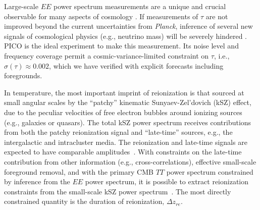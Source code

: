 \documentclass[PICOReport.tex]{subfiles}
\begin{document}
Large-scale $EE$ power spectrum measurements are a unique and crucial observable for many aspects of cosmology .  
If measurements of $\tau$ are not improved beyond the current uncertainties from {\em Planck}, inference of several new signals 
of cosmological physics (e.g., neutrino mass) will be severely hindered .  
PICO is the ideal experiment to make this measurement.  
Its noise level and frequency coverage permit a cosmic-variance-limited constraint on $\tau$, i.e., $\sigma(\tau) \approx 0.002$, which we have verified with explicit forecasts including foregrounds. 

In temperature, the most important imprint of reionization is that sourced at small angular scales by the ``patchy'' kinematic 
Sunyaev-Zel'dovich (kSZ) effect, due to the peculiar velocities of free electron bubbles around ionizing sources (e.g., galaxies or quasars).  
The total kSZ power spectrum receives contributions from both the patchy reionization signal and ``late-time'' sources, e.g., the intergalactic and 
intracluster media.  The reionization and late-time signals are expected to have comparable 
amplitudes~\citep{Shaw2012,MMS2012,Battaglia2013}.  With constraints on the late-time contribution from other 
information (e.g., cross-correlations), effective small-scale foreground removal, and with the primary CMB $TT$ power 
spectrum constrained by inference from the $EE$ power spectrum, it is possible to extract reionization constraints from the 
small-scale kSZ power spectrum~\citep{calabrese/etal/2014}.  The most directly constrained quantity is the duration of 
reionization, $\Delta z_{re}$. 
\end{document}
